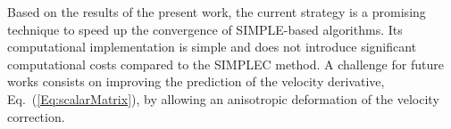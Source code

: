 \documentclass[final,3p,times,11pt,onecolumn]{myElsarticle}
\numberwithin{equation}{section}
\begin{document}
Based on the results of the present work, the current strategy is a promising technique to speed up the convergence of SIMPLE-based algorithms. Its computational implementation is simple and does not introduce significant computational costs compared to the SIMPLEC method. 
A challenge for future works consists on improving the prediction of the velocity derivative, Eq.~(\ref{Eq:scalarMatrix}), by allowing an anisotropic deformation of the velocity correction. %



\end{document}
